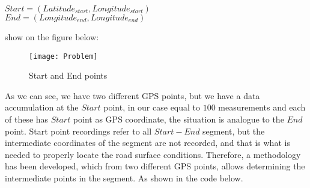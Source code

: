 \documentclass[tesi]{subfiles}
\begin{document}
\begin{center}
 $Start = (Latitude_{start}, Longitude_{start})$\\
 $End = (Longitude_{end}, Longitude_{end})$
\end{center}

show on the figure below:
\begin{figure}[H]	

\centering
\texttt{[image: Problem]} \label{GPS Points Problem}
 \caption{Start and End points}
  \label{fig:GPS Points Problem}
\end{figure}


As we can see, we have two different GPS points, but we have a data accumulation at the $Start$ point, in our case equal to $100$ measurements and each of these has $Start$ point as GPS coordinate, the situation is analogue to the $End$ point.
Start point recordings refer to all $Start-End$ segment, but the intermediate coordinates of the segment are not recorded, and that is what is needed to properly locate the road surface conditions.
Therefore, a methodology has been developed, which from two different GPS points, allows determining the intermediate points in the segment. As shown in the code below.
\end{document}
